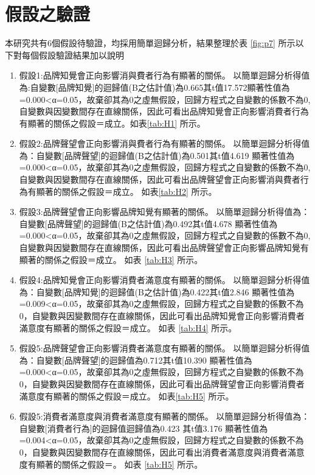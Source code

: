 \section{假設之驗證}
本研究共有6個假設待驗證，均採用簡單迴歸分析，結果整理於表 \ref{fig:p7} 所示以下對每個假設驗證結果加以說明
\begin{enumerate}
\item 假設1:品牌知覺會正向影響消與費者行為有顯著的關係。
以簡單迴歸分析得值為:自變數[品牌知覺]的迴歸值(B之估計值)為0.665其t值17.572顯著性值為=0.000<α=0.05，故棄卻其為0之虛無假設，回歸方程式之自變數的係數不為0,自變數與因變數間存在直線關係，因此可看出品牌知覺會正向影響消費者行為有顯著的關係之假設＝成立。如表\ref{tab:H1}  所示。
\item 假設2:品牌聲望會正向影響消與費者行為有顯著的關係。
以簡單迴歸分析得值為：自變數[品牌聲望]的迴歸值(B之估計值)為0.501其t值4.619 顯著性值為=0.000<α=0.05，故棄卻其為0之虛無假設，回歸方程式之自變數的係數不為0,自變數與因變數間存在直線關係，因此可看出品牌聲望會正向影響消與費者行為有顯著的關係之假設＝成立。 如表\ref{tab:H2}  所示。
\item 假設3:品牌聲望會正向影響品牌知覺有顯著的關係。
以簡單迴歸分析得值為：自變數[品牌聲望]的迴歸值(B之估計值)為0.492其t值4.678 顯著性值為=0.000<α=0.05，故棄卻其為0之虛無假設，回歸方程式之自變數的係數不為0,自變數與因變數間存在直線關係，因此可看出品牌聲望會正向影響品牌知覺有顯著的關係之假設＝成立。 如表 \ref{tab:H3}  所示。
\item 假設4:品牌知覺會正向影響消費者滿意度有顯著的關係。
以簡單迴歸分析得值為：自變數[品牌知覺]的迴歸值(B之估計值)為0.422其t值2.846 顯著性值為=0.009<α=0.05，故棄卻其為0之虛無假設，回歸方程式之自變數的係數不為0，自變數與因變數間存在直線關係，因此可看出品牌知覺會正向影響消費者滿意度有顯著的關係之假設＝成立。 如表 \ref{tab:H4}  所示。
\item 假設5:品牌聲望會正向影響消費者滿意度有顯著的關係。
以簡單迴歸分析得值為：自變數[品牌聲望]的迴歸值為0.712其t值10.390 顯著性值為=0.000<α=0.05，故棄卻其為0之虛無假設，回歸方程式之自變數的係數不為0，自變數與因變數間存在直線關係，因此可看出品牌聲望會正向影響消費者滿意度有顯著的關係之假設＝成立。 如表\ref{tab:H5}  所示。
\item 假設5:消費者滿意度與消費者滿意度有顯著的關係。
以簡單迴歸分析得值為：自變數[消費者行為]的迴歸值迴歸值為0.423 其t值3.176 顯著性值為=0.004<α=0.05，故棄卻其為0之虛無假設，回歸方程式之自變數的係數不為0，自變數與因變數間存在直線關係，因此可看出消費者滿意度與消費者滿意度有顯著的關係之假設＝。 如表 \ref{tab:H5}  所示。
\end{enumerate}



